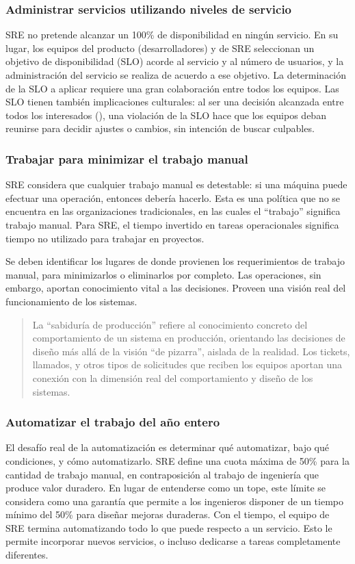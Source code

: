 \subsubsection{Administrar servicios utilizando niveles de servicio}
%
SRE no pretende alcanzar un 100\% de disponibilidad en ningún
servicio. En su lugar, los equipos del producto (desarrolladores) y de
SRE seleccionan un objetivo de disponibilidad (SLO) acorde al servicio
y al número de usuarios, y la administración del servicio se realiza
de acuerdo a ese objetivo. La determinación de la SLO a aplicar
requiere una gran colaboración entre todos los equipos. Las SLO tienen
también implicaciones culturales: al ser una decisión alcanzada entre
todos los interesados (), una violación de la SLO
hace que los equipos deban reunirse para decidir ajustes o cambios,
sin intención de buscar culpables.
%
\subsubsection{Trabajar para minimizar el trabajo manual}
%
SRE considera que cualquier trabajo manual es detestable: si una
máquina puede efectuar una operación, entonces debería hacerlo. Esta
es una política que no se encuentra en las organizaciones
tradicionales, en las cuales el ``trabajo'' significa trabajo
manual. Para SRE, el tiempo invertido en tareas operacionales
significa tiempo no utilizado para trabajar en proyectos.

Se deben identificar los lugares de donde provienen los requerimientos
de trabajo manual, para minimizarlos o eliminarlos por completo. Las
operaciones, sin embargo, aportan conocimiento vital a las
decisiones. Proveen una visión real del funcionamiento de los
sistemas.
%
\begin{quote}
  \smallskip\newline
  La ``sabiduría de producción'' refiere al conocimiento concreto del
  comportamiento de un sistema en producción, orientando las
  decisiones de diseño más allá de la visión ``de pizarra'', aislada
  de la realidad. Los tickets, llamados, y otros tipos de solicitudes
  que reciben los equipos aportan una conexión con la dimensión real
  del comportamiento y diseño de los sistemas.
\end{quote}
%
\subsubsection{Automatizar el trabajo del año entero}
%
El desafío real de la automatización es determinar qué automatizar,
bajo qué condiciones, y cómo automatizarlo. SRE define una cuota
máxima de 50\% para la cantidad de trabajo manual, en contraposición
al trabajo de ingeniería que produce valor duradero. En lugar de
entenderse como un tope, este límite se considera como una garantía
que permite a los ingenieros disponer de un tiempo mínimo del 50\%
para diseñar mejoras duraderas. Con el tiempo, el equipo de SRE
termina automatizando todo lo que puede respecto a un servicio. Esto
le permite incorporar nuevos servicios, o incluso dedicarse a tareas
completamente diferentes.
%

